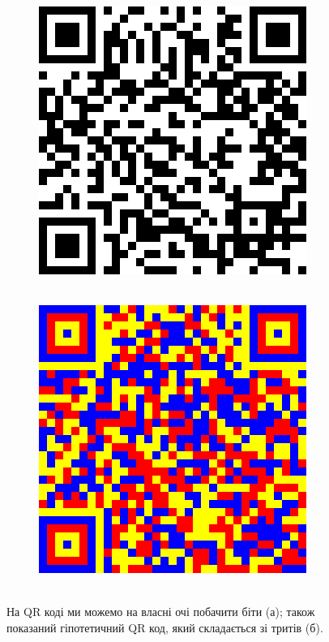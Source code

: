 \begin{figure}
  \centering
  \begin{subfigure}[b]{0.45\textwidth}
    \centering
    \includegraphics[width=\textwidth]{images/qr2.png}
    \caption{~}
    \label{Pic_QR_BW}
  \end{subfigure}
  \hfill
  \begin{subfigure}[b]{0.45\textwidth}
    \centering
    \includegraphics[width=\textwidth]{images/qr3.png}
    \caption{~}
    \label{Pic_QR_Color}
  \end{subfigure}
  \caption{На QR коді ми можемо на власні очі побачити біти (а); також показаний гіпотетичний QR код, який складається зі тритів (б).}
  \label{PicQR}
\end{figure}

